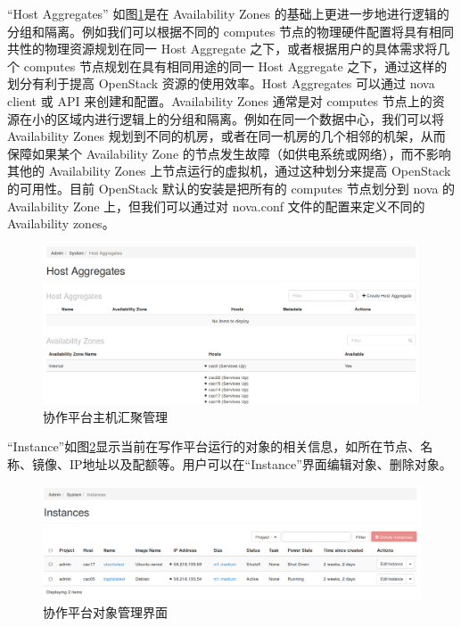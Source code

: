 \documentclass[12pt]{article}
\begin{document}
``Host Aggregates'' 如图\ref{fig:adminsystemhostagregates}是在 Availability Zones 的基础上更进一步地进行逻辑的分组和隔离。例如我们可以根据不同的 computes 节点的物理硬件配置将具有相同共性的物理资源规划在同一 Host Aggregate 之下，或者根据用户的具体需求将几个 computes 节点规划在具有相同用途的同一 Host Aggregate 之下，通过这样的划分有利于提高 OpenStack 资源的使用效率。Host Aggregates 可以通过 nova client 或 API 来创建和配置。Availability Zones 通常是对 computes 节点上的资源在小的区域内进行逻辑上的分组和隔离。例如在同一个数据中心，我们可以将 Availability Zones 规划到不同的机房，或者在同一机房的几个相邻的机架，从而保障如果某个 Availability Zone 的节点发生故障（如供电系统或网络），而不影响其他的 Availability Zones 上节点运行的虚拟机，通过这种划分来提高 OpenStack 的可用性。目前 OpenStack 默认的安装是把所有的 computes 节点划分到 nova 的 Availability Zone 上，但我们可以通过对 nova.conf 文件的配置来定义不同的 Availability zones。
\begin{figure}[!htb]
\centering
\includegraphics[width=6in]{./figures/Admin_System_HostAggregates}
\caption{协作平台主机汇聚管理}
\label{fig:adminsystemhostagregates}
\end{figure}
``Instance''如图\ref{fig:adminsysteminstances}显示当前在写作平台运行的对象的相关信息，如所在节点、名称、镜像、IP地址以及配额等。用户可以在``Instance''界面编辑对象、删除对象。
\begin{figure}[!htb]
\centering
\includegraphics[width=6in]{./figures/Admin_System_Instances}
\caption{协作平台对象管理界面}
\label{fig:adminsysteminstances}
\end{figure}
\end{document}
